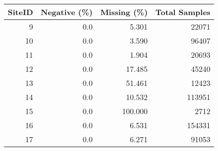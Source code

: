 \begin{tabular}{rrrr}
\toprule
 SiteID &  Negative (\%) &  Missing (\%) &  Total Samples \\
\midrule
      9 &           0.0 &        5.301 &          22071 \\
     10 &           0.0 &        3.590 &          96407 \\
     11 &           0.0 &        1.904 &          20693 \\
     12 &           0.0 &       17.485 &          45240 \\
     13 &           0.0 &       51.461 &          12423 \\
     14 &           0.0 &       10.532 &         113951 \\
     15 &           0.0 &      100.000 &           2712 \\
     16 &           0.0 &        6.531 &         154331 \\
     17 &           0.0 &        6.271 &          91053 \\
\bottomrule
\end{tabular}
